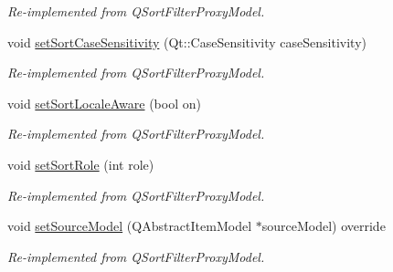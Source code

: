 \begin{DoxyCompactItemize}
\begin{DoxyCompactList}\small\item\em Re-\/implemented from Q\+Sort\+Filter\+Proxy\+Model. \end{DoxyCompactList}\item 
void \hyperlink{class_mdt_1_1_item_model_1_1_sort_proxy_model_a4e681acfa6322f38bb6f8318e1f6e355}{set\+Sort\+Case\+Sensitivity} (Qt\+::\+Case\+Sensitivity case\+Sensitivity)\hypertarget{class_mdt_1_1_item_model_1_1_sort_proxy_model_a4e681acfa6322f38bb6f8318e1f6e355}{}\label{class_mdt_1_1_item_model_1_1_sort_proxy_model_a4e681acfa6322f38bb6f8318e1f6e355}

\begin{DoxyCompactList}\small\item\em Re-\/implemented from Q\+Sort\+Filter\+Proxy\+Model. \end{DoxyCompactList}\item 
void \hyperlink{class_mdt_1_1_item_model_1_1_sort_proxy_model_af82b8bcdf55968707127d4ae53b5580e}{set\+Sort\+Locale\+Aware} (bool on)\hypertarget{class_mdt_1_1_item_model_1_1_sort_proxy_model_af82b8bcdf55968707127d4ae53b5580e}{}\label{class_mdt_1_1_item_model_1_1_sort_proxy_model_af82b8bcdf55968707127d4ae53b5580e}

\begin{DoxyCompactList}\small\item\em Re-\/implemented from Q\+Sort\+Filter\+Proxy\+Model. \end{DoxyCompactList}\item 
void \hyperlink{class_mdt_1_1_item_model_1_1_sort_proxy_model_aea5ce7fffac4ee8550cfec678d08c996}{set\+Sort\+Role} (int role)
\begin{DoxyCompactList}\small\item\em Re-\/implemented from Q\+Sort\+Filter\+Proxy\+Model. \end{DoxyCompactList}\item 
void \hyperlink{class_mdt_1_1_item_model_1_1_sort_proxy_model_a5c50431f3ec1f559af45ee399d476d97}{set\+Source\+Model} (Q\+Abstract\+Item\+Model $\ast$source\+Model) override\hypertarget{class_mdt_1_1_item_model_1_1_sort_proxy_model_a5c50431f3ec1f559af45ee399d476d97}{}\label{class_mdt_1_1_item_model_1_1_sort_proxy_model_a5c50431f3ec1f559af45ee399d476d97}

\begin{DoxyCompactList}\small\item\em Re-\/implemented from Q\+Sort\+Filter\+Proxy\+Model. \end{DoxyCompactList}\end{DoxyCompactItemize}


